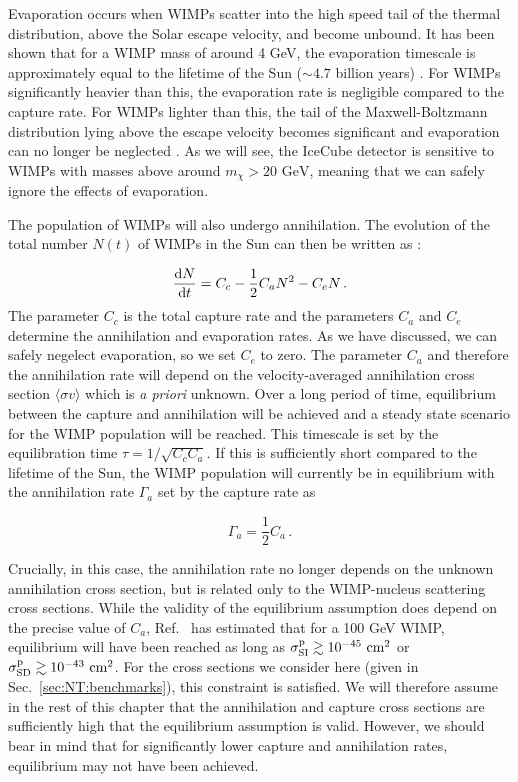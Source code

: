 Evaporation occurs when WIMPs scatter into the high speed tail of the thermal distribution, above the Solar escape velocity, and become unbound. It has been shown that for a WIMP mass of around 4 GeV, the evaporation timescale is approximately equal to the lifetime of the Sun ($\sim4.7$ billion years) \cite{Gould:1987b}. For WIMPs significantly heavier than this, the evaporation rate is negligible compared to the capture rate. For WIMPs lighter than this, the tail of the Maxwell-Boltzmann distribution lying above the escape velocity becomes significant and evaporation can no longer be neglected \cite{Krauss:1986,Busoni:2013b}. As we will see, the IceCube detector is sensitive to WIMPs with masses above around $m_\chi > 20 \textrm{ GeV} $, meaning that we can safely ignore the effects of evaporation.

The population of WIMPs will also undergo annihilation. The evolution of the total number $N(t)$ of WIMPs in the Sun can then be written as \cite{Griest:1987}:

\begin{equation}
\frac{\mathrm{d}N}{\mathrm{d}t} = C_c - \frac{1}{2}C_a N^2 - C_e N\,.
\end{equation}
The parameter $C_c$ is the total capture rate and the parameters $C_a$ and $C_e$ determine the annihilation and evaporation rates. As we have discussed, we can safely negelect evaporation, so we set $C_e$ to zero. The parameter $C_a$ and therefore the annihilation rate will depend on the velocity-averaged annihilation cross section $\langle \sigma v \rangle$ which is \textit{a priori} unknown. Over a long period of time, equilibrium between the capture and annihilation will be achieved and a steady state scenario for the WIMP population will be reached. This timescale is set by the equilibration time $\tau = 1/\sqrt{C_c C_a}$. If this is sufficiently short compared to the lifetime of the Sun, the WIMP population will currently be in equilibrium with the annihilation rate $\Gamma_a$ set by the capture rate as

\begin{equation}
\Gamma_a = \frac{1}{2}C_a\,.
\end{equation}


Crucially, in this case, the annihilation rate no longer depends on the unknown annihilation cross section, but is related only to the WIMP-nucleus scattering cross sections. While the validity of the equilibrium assumption does depend on the precise value of $C_a$, Ref.~\cite{Peter:2009} has estimated that for a 100 GeV WIMP, equilibrium will have been reached as long as $\sigmapsi \gtrsim 10^{-45} \cmsq$ or $\sigmapsd \gtrsim 10^{-43} \cmsq$. For the cross sections we consider here (given in Sec.~\ref{sec:NT:benchmarks}), this constraint is satisfied. We will therefore assume in the rest of this chapter that the annihilation and capture cross sections are sufficiently high that the equilibrium assumption is valid. However, we should bear in mind that for significantly lower capture and annihilation rates, equilibrium may not have been achieved. 


